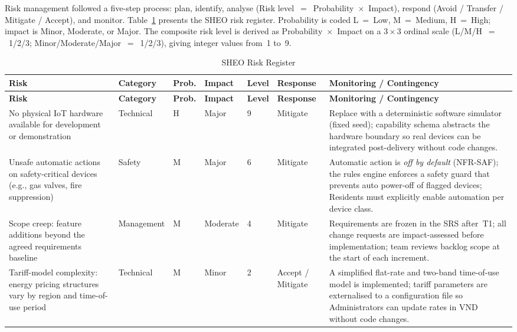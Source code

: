 Risk management followed a five-step process: plan, identify, analyse
(Risk level~$=$~Probability~$\times$~Impact), respond
(Avoid / Transfer / Mitigate / Accept), and monitor.
Table~\ref{tab:risks} presents the SHEO risk register.
Probability is coded L~=~Low, M~=~Medium, H~=~High; impact is
Minor, Moderate, or Major.  The composite risk level is derived as
Probability~$\times$~Impact on a $3{\times}3$ ordinal scale
(L/M/H~$=$~1/2/3; Minor/Moderate/Major~$=$~1/2/3), giving integer values from~1
to~9.

\begin{longtable}{@{} p{2.5cm} p{1.4cm} p{0.7cm} p{1.4cm} p{0.7cm} p{1.5cm} p{4.3cm} @{}}
  \caption{SHEO Risk Register}
  \label{tab:risks} \\
  \toprule
  \textbf{Risk} & \textbf{Category} & \textbf{Prob.} & \textbf{Impact} & \textbf{Level} & \textbf{Response} & \textbf{Monitoring / Contingency} \\
  \midrule
  \endfirsthead
  \toprule
  \textbf{Risk} & \textbf{Category} & \textbf{Prob.} & \textbf{Impact} & \textbf{Level} & \textbf{Response} & \textbf{Monitoring / Contingency} \\
  \midrule
  \endhead
  \bottomrule
  \endlastfoot

  No physical IoT hardware available for development or demonstration
    & Technical
    & H
    & Major
    & 9
    & Mitigate
    & Replace with a deterministic software simulator (fixed seed); capability schema abstracts the hardware boundary so real devices can be integrated post-delivery without code changes. \\[4pt]

  Unsafe automatic actions on safety-critical devices (e.g., gas valves, fire suppression)
    & Safety
    & M
    & Major
    & 6
    & Mitigate
    & Automatic action is \emph{off by default} (NFR-SAF); the rules engine enforces a safety guard that prevents auto power-off of flagged devices; Residents must explicitly enable automation per device class. \\[4pt]

  Scope creep: feature additions beyond the agreed requirements baseline
    & Management
    & M
    & Moderate
    & 4
    & Mitigate
    & Requirements are frozen in the SRS after~T1; all change requests are impact-assessed before implementation; team reviews backlog scope at the start of each increment. \\[4pt]

  Tariff-model complexity: energy pricing structures vary by region and time-of-use period
    & Technical
    & M
    & Minor
    & 2
    & Accept / Mitigate
    & A simplified flat-rate and two-band time-of-use model is implemented; tariff parameters are externalised to a configuration file so Administrators can update rates in VND without code changes. \\[4pt]


\end{longtable}
